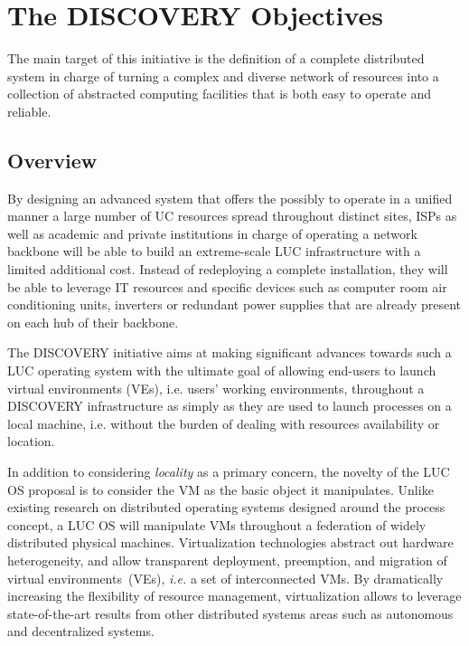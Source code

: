 \documentclass[11pt,a4paper,twoside]{article}
\newcommand{\ie}{\textit{i.e.}\xspace}
\begin{document}
\section{The DISCOVERY Objectives}
The main target of this initiative is the definition of a
complete distributed system in charge of turning a complex and diverse network
of resources into a collection of abstracted computing facilities that is both
easy to operate and reliable. 

\subsection{Overview}
By designing an advanced system that offers the possibly to operate  in a unified manner a large number of UC resources spread throughout distinct sites,
ISPs as well as academic and private institutions in
charge of operating a network backbone will be able to build an extreme-scale
LUC infrastructure with a limited additional cost. Instead of redeploying a
complete installation, they will be able to leverage IT resources and
specific devices such as computer room air conditioning units, inverters or
redundant power supplies that are already present on each hub of their
backbone. 

The DISCOVERY initiative aims at making
significant advances towards such a LUC operating system with the ultimate goal
of allowing end-users to launch virtual environments (VEs), i.e. users’ working
environments, throughout a DISCOVERY infrastructure as simply as they are used
to launch processes on a local machine, i.e. without the burden of dealing with
resources availability or location.

In addition to considering \emph{locality} as a primary concern, the novelty of the LUC OS
proposal is to consider the VM as the basic object it manipulates.  Unlike existing
research on distributed operating systems designed around the process concept, a LUC OS
will manipulate VMs throughout a federation of widely distributed physical
machines. Virtualization technologies abstract out hardware heterogeneity, and allow
transparent deployment, preemption, and migration of virtual environments~(VEs), \ie a set
of interconnected VMs.  By dramatically increasing the flexibility of resource management,
virtualization allows to leverage state-of-the-art results from other distributed systems
areas such as autonomous and decentralized systems. 
 
\end{document}
